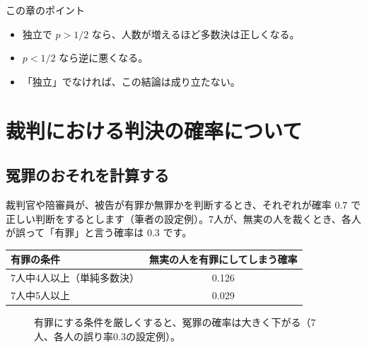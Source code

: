 \documentclass[a4paper,11pt,openany]{ltjsbook}
\begin{document}
\begin{pointbox}{この章のポイント}
\begin{itemize}[leftmargin=1.5em]
\item 独立で $p>1/2$ なら、人数が増えるほど多数決は正しくなる。
\item $p<1/2$ なら逆に悪くなる。
\item 「独立」でなければ、この結論は成り立たない。
\end{itemize}
\end{pointbox}

\chapter{裁判における判決の確率について}

\section{冤罪のおそれを計算する}

裁判官や陪審員が、被告が有罪か無罪かを判断するとき、それぞれが確率 $0.7$ で正しい判断をするとします（筆者の設定例）。7人が、無実の人を裁くとき、各人が誤って「有罪」と言う確率は $0.3$ です。

\begin{center}
\begin{tabular}{lc}
\toprule
有罪の条件 & 無実の人を有罪にしてしまう確率\\
\midrule
7人中4人以上（単純多数決） & 0.126\\
7人中5人以上 & 0.029\\
\bottomrule
\end{tabular}
\end{center}

\begin{figure}[htbp]
\centering
{}
\caption{有罪にする条件を厳しくすると、冤罪の確率は大きく下がる（7人、各人の誤り率0.3の設定例）。}
\end{figure}
\end{document}
